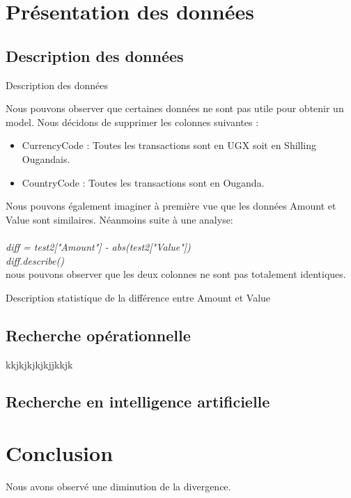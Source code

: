 \documentclass{article}
\begin{document}
\section{Présentation des données}
\subsection{Description des données}

\begin{table}[h]
\centering
{}
\caption{Description des données}
\end{table}

Nous pouvons observer que certaines données ne sont pas utile pour obtenir un model. 
Nous décidons de supprimer les colonnes suivantes :
\begin{itemize}
    \item CurrencyCode : Toutes les transactions sont en UGX soit en Shilling Ougandais.
    \item CountryCode : Toutes les transactions sont en Ouganda.
\end{itemize} 
Nous pouvons également imaginer à première vue que les données Amount et Value sont similaires.
Néanmoins suite à une analyse: \\ \\
\emph{diff = test2["Amount"] - abs(test2["Value"])\\diff.describe()}\\

nous pouvons observer que les deux colonnes ne sont pas totalement identiques.\\

\begin{table}[h]
    \centering
    \caption{Description statistique de la différence entre Amount et Value}
        
 \end{table}






\subsection{Recherche opérationnelle}

kkjkjkjkjkjjkkjk
\subsection{Recherche en intelligence artificielle}
\section{Conclusion}
Nous avons observé une diminution de la divergence.
\end{document}
